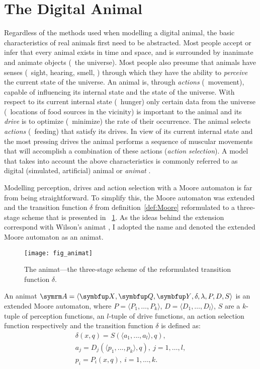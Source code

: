 \section{The Digital Animal}
\label{sec:animat}
Regardless of the methods used when modelling a digital animal, the basic characteristics of real animals first need to be abstracted. Most people accept or infer that every animal exists in time and space, and is surrounded by inanimate and animate objects (\ie\ the universe). Most people also presume that animals have senses (\ie\ sight, hearing, smell, \etc) through which they have the ability to \emph{perceive} the current state of the universe. An animal is, through \emph{actions} (\eg\ movement), capable of influencing its internal state and the state of the universe. With respect to its current internal state (\eg\ hunger) only certain data from the universe (\eg\ locations of food sources in the vicinity) is important to the animal and its \emph{drive} is to optimize (\eg\ minimize) the rate of their occurrence. The animal selects \emph{actions} (\eg\ feeding) that satisfy its drives. In view of its current internal state and the most pressing drives the animal performs a sequence of muscular movements that will accomplish a combination of these actions (\emph{action selection}). A model that takes into account the above characteristics is commonly referred to as digital (simulated, artificial) animal or \emph{animat} \cite{cliff:1993,watts:1998,wilson:1985}.

Modelling perception, drives and action selection with a Moore automaton is far from being straightforward. To simplify this, the Moore automaton was extended  \cite{lebar_bajec:2002,lebar_bajec:2003a,lebar_bajec:2003b} and the transition function $\delta$ from definition~\ref{def:Moore} reformulated to a three-stage scheme that is presented in \fig~\ref{fig:animat}. As the ideas behind the extension correspond with Wilson's animat \cite{wilson:1985}, I adopted the name and denoted the extended Moore automaton as an animat.

\begin{figure}
  \texttt{[image: fig\_animat]}
  \caption{The animat---the three-stage scheme of the reformulated transition function $\delta$.}
  \label{fig:animat}
\end{figure}

\begin{definition}
  \label{def:animat}
  An animat $\autom{A}=\langle\set{X},\set{Q},\set{Y},\delta,\lambda,P,D,S\rangle$ is an extended Moore automaton, where $P=\langle P_1,\ldots,P_k\rangle$, $D=\langle D_1,\ldots,D_l\rangle$, $S$ are a $k$-tuple of perception functions, an $l$-tuple of drive functions, an action selection function respectively and the transition function $\delta$ is defined as:
  \begin{eqnarray}
    & \delta(x,q) = S(\langle a_1,...,a_l\rangle,q), & \label{eq:animat:delta}\\
    & a_j = D_j(\langle p_1,...,p_k\rangle,q),\ j=1,\ldots,l, & \\
    & p_i = P_i(x,q),\ i=1,\ldots,k. & \label{eq:animat:Pi}
  \end{eqnarray}
\end{definition}

